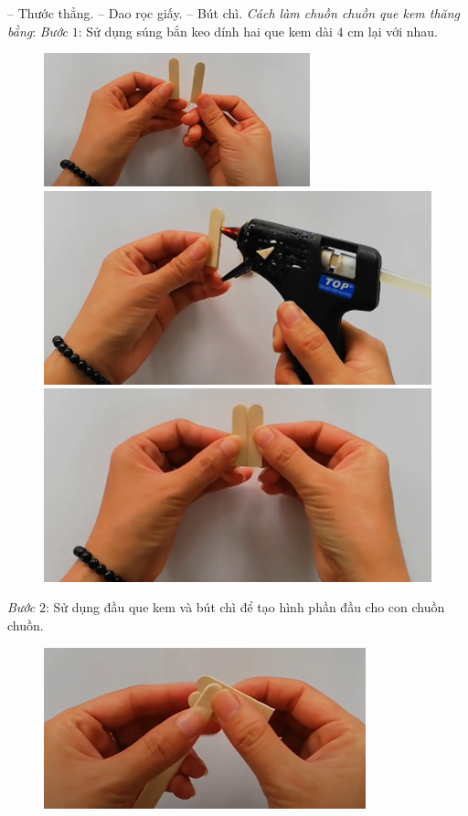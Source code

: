 \begin{multicols}{2}
	\vskip 0.05cm
	-- Thước thẳng.
	\vskip 0.05cm
	-- Dao rọc giấy.
	\vskip 0.05cm
	-- Bút chì.
	\vskip 0.05cm
	\textit{Cách làm chuồn chuồn que kem thăng bằng}:
	\vskip 0.1cm
	\textit{Bước} $1$: Sử dụng súng bắn keo dính hai que kem dài $4$ cm lại với nhau.
	\begin{figure}[H]
		\vspace*{-5pt}
		\centering
		\captionsetup{labelformat= empty, justification=centering}
		\includegraphics[width=0.7\linewidth]{11}
		
		\vspace*{1pt}
		\includegraphics[width=0.7\linewidth]{12}
		
		\vspace*{1pt}
		\hspace*{1pt}\includegraphics[width=0.7\linewidth]{13}
	\end{figure}
	\textit{Bước} $2$: Sử dụng đầu que kem và bút chì để tạo hình phần đầu cho con chuồn chuồn.
	\begin{figure}[H]
		\vspace*{-5pt}
		\centering
		\captionsetup{labelformat= empty, justification=centering}
		\includegraphics[width=0.7\linewidth]{14}
		

\end{figure}
\end{multicols}
